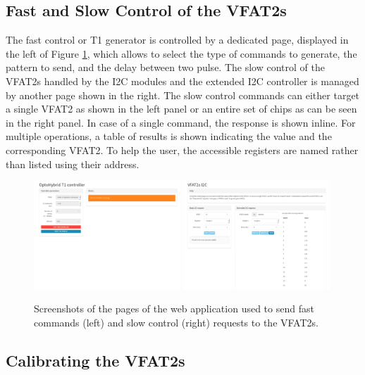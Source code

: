     \subsection{Fast and Slow Control of the VFAT2s}

      The fast control or T1 generator is controlled by a dedicated page, displayed in the left of Figure \ref{fig:II-3-app-control}, which allows to select the type of commands to generate, the pattern to send, and the delay between two pulse. The slow control of the VFAT2s handled by the I2C modules and the extended I2C controller is managed by another page shown in the right. The slow control commands can either target a single VFAT2 as shown in the left panel or an entire set of chips as can be seen in the right panel. In case of a single command, the response is shown inline. For multiple operations, a table of results is shown indicating the value and the corresponding VFAT2. To help the user, the accessible registers are named rather than listed using their address.

      \begin{figure}[h!]
        \centering
        \includegraphics[width=0.49\textwidth]{img/II-3-test-beam/app-t1.png}
        \includegraphics[width=0.49\textwidth]{img/II-3-test-beam/app-i2c.png}
        \caption{Screenshots of the pages of the web application used to send fast commands (left) and slow control (right) requests to the VFAT2s.}
        \label{fig:II-3-app-control}
      \end{figure}

    \subsection{Calibrating the VFAT2s}

